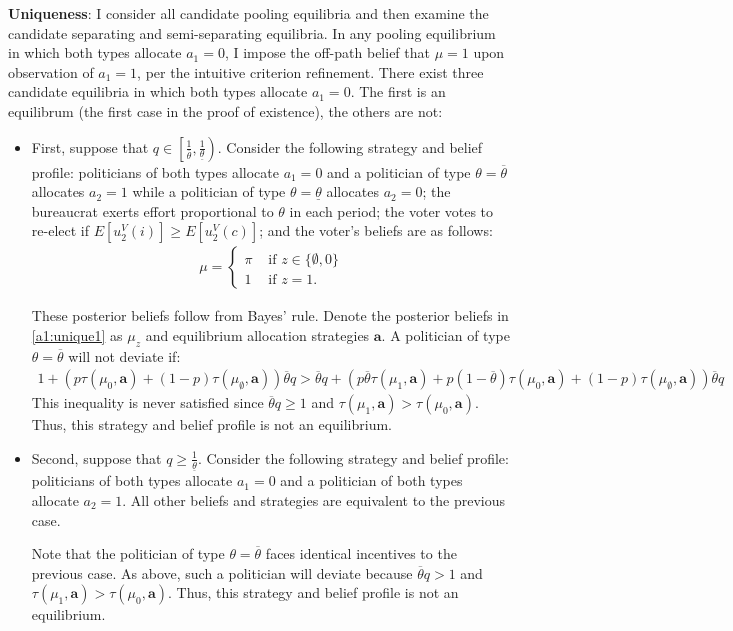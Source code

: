 \documentclass[11pt,english]{article}
\begin{document}
\textbf{Uniqueness}: I consider all candidate pooling equilibria and then examine the candidate separating and semi-separating equilibria. In any pooling equilibrium in which both types allocate $a_1 = 0$, I impose the off-path belief that $\mu = 1$ upon observation of $a_1 = 1$, per the intuitive criterion refinement. There exist three candidate equilibria in which both types allocate $a_1 =0$. The first is an equilibrum (the first case in the proof of existence), the others are not:
\begin{itemize}
\item First, suppose that $q \in \left[\frac{1}{\overline{\theta}}, \frac{1}{\underline{\theta}}\right)$. Consider the following strategy and belief profile: politicians of both types allocate $a_1 = 0$ and a politician of type $\theta = \overline{\theta}$  allocates $a_2 = 1$ while a politician of type $\theta = \underline{\theta}$ allocates $a_2 = 0$; the bureaucrat exerts effort proportional to $\theta$ in each period; the voter votes to re-elect if $E[u_2^V(i)] \geq E[u_2^V(c)]$; and the voter's beliefs are as follows:
\begin{align}\label{a1:unique1}
\mu = \begin{cases}
\pi & \text{ if } z \in \{\emptyset, 0\}\\
1 & \text{ if } z = 1.
\end{cases}
\end{align}

These posterior beliefs follow from Bayes' rule. Denote the posterior beliefs in \eqref{a1:unique1} as $\mu_z$ and equilibrium allocation strategies $\boldsymbol{a}$. A politician of type $\theta = \overline{\theta}$ will not deviate if:
\begin{align*}
1 + (p\tau(\mu_0, \boldsymbol{a}) + (1-p)\tau(\mu_\emptyset, \boldsymbol{a}))\overline{\theta}q  > \overline{\theta}q + (p\overline{\theta}\tau(\mu_1, \boldsymbol{a}) + p(1-\overline{\theta})\tau(\mu_0, \boldsymbol{a}) + (1-p)\tau(\mu_\emptyset, \boldsymbol{a}))\overline{\theta}q
\end{align*}
This inequality is never satisfied since $\overline{\theta}q \geq 1$ and $\tau(\mu_1, \boldsymbol{a}) > \tau(\mu_0, \boldsymbol{a})$. Thus, this strategy and belief profile is not an equilibrium.
\item Second, suppose that $q \geq \frac{1}{\underline{\theta}}$. Consider the following strategy and belief profile: politicians of both types allocate $a_1 = 0$ and a politician of both types allocate $a_2 = 1$. All other beliefs and strategies are equivalent to the previous case. 

Note that the politician of type $\theta = \overline{\theta}$ faces identical incentives to the previous case. As above, such a politician will deviate because $\overline{\theta}q > 1$ and $\tau(\mu_1, \boldsymbol{a}) > \tau(\mu_0, \boldsymbol{a})$. Thus, this strategy and belief profile is not an equilibrium.
\end{itemize}
\end{document}

